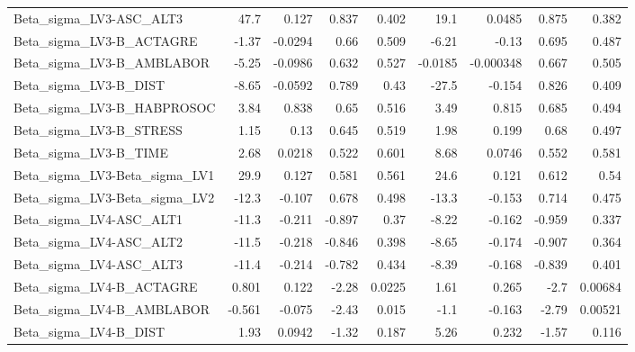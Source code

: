 \begin{tabular}{lrrrrrrrr}
Beta\_sigma\_LV3-ASC\_ALT3       &        47.7 &        0.127 &   0.837 &    0.402 &       19.1 &      0.0485 &        0.875 &         0.382 \\
Beta\_sigma\_LV3-B\_ACTAGRE      &       -1.37 &      -0.0294 &    0.66 &    0.509 &      -6.21 &       -0.13 &        0.695 &         0.487 \\
Beta\_sigma\_LV3-B\_AMBLABOR     &       -5.25 &      -0.0986 &   0.632 &    0.527 &    -0.0185 &   -0.000348 &        0.667 &         0.505 \\
Beta\_sigma\_LV3-B\_DIST         &       -8.65 &      -0.0592 &   0.789 &     0.43 &      -27.5 &      -0.154 &        0.826 &         0.409 \\
Beta\_sigma\_LV3-B\_HABPROSOC    &        3.84 &        0.838 &    0.65 &    0.516 &       3.49 &       0.815 &        0.685 &         0.494 \\
Beta\_sigma\_LV3-B\_STRESS       &        1.15 &         0.13 &   0.645 &    0.519 &       1.98 &       0.199 &         0.68 &         0.497 \\
Beta\_sigma\_LV3-B\_TIME         &        2.68 &       0.0218 &   0.522 &    0.601 &       8.68 &      0.0746 &        0.552 &         0.581 \\
Beta\_sigma\_LV3-Beta\_sigma\_LV1 &        29.9 &        0.127 &   0.581 &    0.561 &       24.6 &       0.121 &        0.612 &          0.54 \\
Beta\_sigma\_LV3-Beta\_sigma\_LV2 &       -12.3 &       -0.107 &   0.678 &    0.498 &      -13.3 &      -0.153 &        0.714 &         0.475 \\
Beta\_sigma\_LV4-ASC\_ALT1       &       -11.3 &       -0.211 &  -0.897 &     0.37 &      -8.22 &      -0.162 &       -0.959 &         0.337 \\
Beta\_sigma\_LV4-ASC\_ALT2       &       -11.5 &       -0.218 &  -0.846 &    0.398 &      -8.65 &      -0.174 &       -0.907 &         0.364 \\
Beta\_sigma\_LV4-ASC\_ALT3       &       -11.4 &       -0.214 &  -0.782 &    0.434 &      -8.39 &      -0.168 &       -0.839 &         0.401 \\
Beta\_sigma\_LV4-B\_ACTAGRE      &       0.801 &        0.122 &   -2.28 &   0.0225 &       1.61 &       0.265 &         -2.7 &       0.00684 \\
Beta\_sigma\_LV4-B\_AMBLABOR     &      -0.561 &       -0.075 &   -2.43 &    0.015 &       -1.1 &      -0.163 &        -2.79 &       0.00521 \\
Beta\_sigma\_LV4-B\_DIST         &        1.93 &       0.0942 &   -1.32 &    0.187 &       5.26 &       0.232 &        -1.57 &         0.116 \\

\end{tabular}
